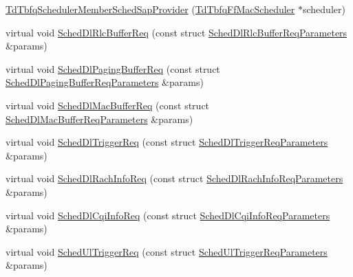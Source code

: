 \begin{DoxyCompactItemize}
\item 
\hyperlink{classns3_1_1TdTbfqSchedulerMemberSchedSapProvider_a25cd2741aff1cf484e5934f9d275315a}{Td\+Tbfq\+Scheduler\+Member\+Sched\+Sap\+Provider} (\hyperlink{classns3_1_1TdTbfqFfMacScheduler}{Td\+Tbfq\+Ff\+Mac\+Scheduler} $\ast$scheduler)
\item 
virtual void \hyperlink{classns3_1_1TdTbfqSchedulerMemberSchedSapProvider_aab0eda4a1fdfd9fb75585d4af1b911f6}{Sched\+Dl\+Rlc\+Buffer\+Req} (const struct \hyperlink{structns3_1_1FfMacSchedSapProvider_1_1SchedDlRlcBufferReqParameters}{Sched\+Dl\+Rlc\+Buffer\+Req\+Parameters} \&params)
\item 
virtual void \hyperlink{classns3_1_1TdTbfqSchedulerMemberSchedSapProvider_a5d8047cbdb144ca752446cc6efe30894}{Sched\+Dl\+Paging\+Buffer\+Req} (const struct \hyperlink{structns3_1_1FfMacSchedSapProvider_1_1SchedDlPagingBufferReqParameters}{Sched\+Dl\+Paging\+Buffer\+Req\+Parameters} \&params)
\item 
virtual void \hyperlink{classns3_1_1TdTbfqSchedulerMemberSchedSapProvider_abf1ef900caf3a1e43cd56973d31b05d0}{Sched\+Dl\+Mac\+Buffer\+Req} (const struct \hyperlink{structns3_1_1FfMacSchedSapProvider_1_1SchedDlMacBufferReqParameters}{Sched\+Dl\+Mac\+Buffer\+Req\+Parameters} \&params)
\item 
virtual void \hyperlink{classns3_1_1TdTbfqSchedulerMemberSchedSapProvider_a60184a404ef2bdaf0d9c3fb4a2d50ec6}{Sched\+Dl\+Trigger\+Req} (const struct \hyperlink{structns3_1_1FfMacSchedSapProvider_1_1SchedDlTriggerReqParameters}{Sched\+Dl\+Trigger\+Req\+Parameters} \&params)
\item 
virtual void \hyperlink{classns3_1_1TdTbfqSchedulerMemberSchedSapProvider_adb80823d9a26f7b722a459174814a1b5}{Sched\+Dl\+Rach\+Info\+Req} (const struct \hyperlink{structns3_1_1FfMacSchedSapProvider_1_1SchedDlRachInfoReqParameters}{Sched\+Dl\+Rach\+Info\+Req\+Parameters} \&params)
\item 
virtual void \hyperlink{classns3_1_1TdTbfqSchedulerMemberSchedSapProvider_a83573202486bea088eeb4c7d0c576b3d}{Sched\+Dl\+Cqi\+Info\+Req} (const struct \hyperlink{structns3_1_1FfMacSchedSapProvider_1_1SchedDlCqiInfoReqParameters}{Sched\+Dl\+Cqi\+Info\+Req\+Parameters} \&params)
\item 
virtual void \hyperlink{classns3_1_1TdTbfqSchedulerMemberSchedSapProvider_add5f151c2ee5f7456008e1e664d0f485}{Sched\+Ul\+Trigger\+Req} (const struct \hyperlink{structns3_1_1FfMacSchedSapProvider_1_1SchedUlTriggerReqParameters}{Sched\+Ul\+Trigger\+Req\+Parameters} \&params)

\end{DoxyCompactItemize}
